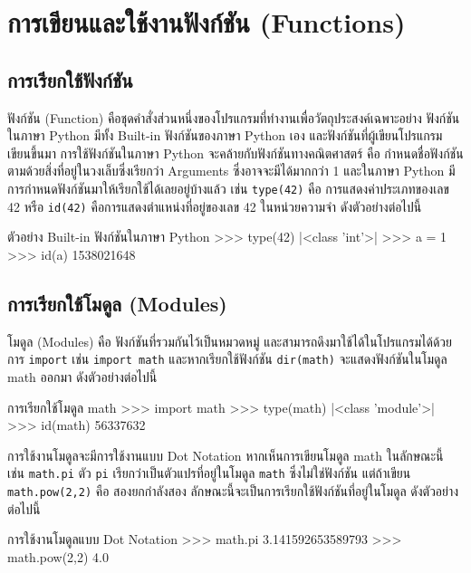 \chapter{การเขียนและใช้งานฟังก์ชัน (Functions)}
\section{การเรียกใช้ฟังก์ชัน}

ฟังก์ชัน (Function) คือชุดคำสั่งส่วนหนึ่งของโปรแกรมที่ทำงานเพื่อวัตถุประสงค์เฉพาะอย่าง ฟังก์ชันในภาษา Python มีทั้ง Built-in ฟังก์ชันของภาษา Python เอง และฟังก์ชันที่ผู้เขียนโปรแกรมเขียนขึ้นมา การใช้ฟังก์ชันในภาษา Python จะคล้ายกับฟังก์ชันทางคณิตศาสตร์ คือ กำหนดชื่อฟังก์ชันตามด้วยสิ่งที่อยู่ในวงเล็บซึ่งเรียกว่า Arguments ซึ่งอาจจะมีได้มากกว่า 1 และในภาษา Python มีการกำหนดฟังก์ชันมาให้เรียกใช้ได้เลยอยู่บ้างแล้ว เช่น \texttt{type(42)} คือ การแสดงค่าประเภทของเลข 42 หรือ \texttt{id(42)} คือการแสดงตำแหน่งที่อยู่ของเลข 42 ในหน่วยความจำ ดังตัวอย่างต่อไปนี้

\begin{codelist}{ตัวอย่าง Built-in ฟังก์ชันในภาษา Python}{}
>>> type(42)
|<class \rq{}int\rq{}>|
>>> a = 1
>>> id(a)
1538021648
\end{codelist}


\section{การเรียกใช้โมดูล (Modules)}

โมดูล (Modules) คือ ฟังก์ชันที่รวมกันไว้เป็นหมวดหมู่ และสามารถดึงมาใช้ได้ในโปรแกรมได้ด้วยการ \texttt{import} เช่น \texttt{import math} และหากเรียกใช้ฟังก์ชัน \texttt{dir(math)} จะแสดงฟังก์ชันในโมดูล math ออกมา ดังตัวอย่างต่อไปนี้

\begin{codelist}{การเรียกใช้โมดูล math}{}
>>> import math
>>> type(math)
|<class \rq{}module\rq{}>|
>>> id(math)
56337632

\end{codelist}


การใช้งานโมดูลจะมีการใช้งานแบบ Dot Notation หากเห็นการเขียนโมดูล math ในลักษณะนี้ เช่น  \texttt{math.pi} ตัว  \texttt{pi} เรียกว่าเป็นตัวแปรที่อยู่ในโมดูล  \texttt{math} ซึ่งไม่ใช่ฟังก์ชัน แต่ถ้าเขียน  \texttt{math.pow(2,2)} คือ สองยกกำลังสอง ลักษณะนี้จะเป็นการเรียกใช้ฟังก์ชันที่อยู่ในโมดูล ดังตัวอย่างต่อไปนี้

\begin{codelist}{การใช้งานโมดูลแบบ Dot Notation}{}
>>> math.pi
3.141592653589793
>>> math.pow(2,2)
4.0
\end{codelist}

